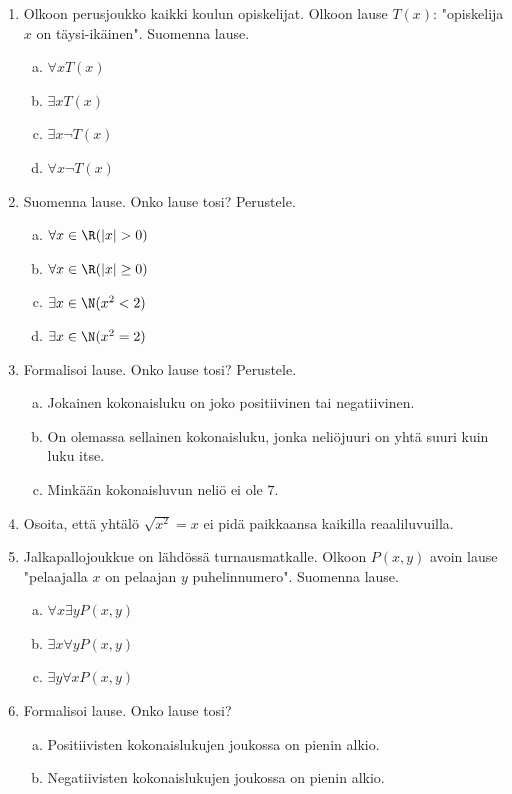 \begin{enumerate}

\item Olkoon perusjoukko kaikki koulun opiskelijat. Olkoon lause
$T(x)$: "opiskelija $x$ on täysi-ikäinen". Suomenna lause.
\begin{enumerate}[a)]
\item $\forall x T(x)$
\item $\exists x T(x)$
\item $\exists x \lnot T(x)$
\item $\forall x \lnot T(x)$
\end{enumerate}

\item Suomenna lause. Onko lause tosi? Perustele.
\begin{enumerate}[a)]
\item $\forall x\in\R (|x| > 0)$
\item $\forall x\in\R (|x| \ge 0)$
\item $\exists x\in\N (x^2 < 2)$
\item $\exists x\in\N (x^2 = 2)$
\end{enumerate}

\item
Formalisoi lause. Onko lause tosi? Perustele.
\begin{enumerate}[a)]
\item Jokainen kokonaisluku on joko positiivinen tai
negatiivinen.
\item On olemassa sellainen kokonaisluku, jonka neliöjuuri on
yhtä suuri kuin luku itse.
\item Minkään kokonaisluvun neliö ei ole $7$.
\end{enumerate}

\item Osoita, että yhtälö $\sqrt{x^2} = x$ ei pidä paikkaansa
kaikilla reaaliluvuilla.

\item Jalkapallojoukkue on lähdössä turnausmatkalle. Olkoon
$P(x,y)$ avoin lause "pelaajalla $x$ on pelaajan $y$
puhelinnumero". Suomenna lause.
\begin{enumerate}[a)]
\item $\forall x \exists y P(x,y)$
\item $\exists x \forall y P(x,y)$
\item $\exists y \forall x P(x,y)$
\end{enumerate}

\item
Formalisoi lause. Onko lause tosi?
\begin{enumerate}[a)]
\item Positiivisten kokonaislukujen joukossa on pienin alkio.
\item Negatiivisten kokonaislukujen joukossa on pienin alkio.
\end{enumerate}


\end{enumerate}
